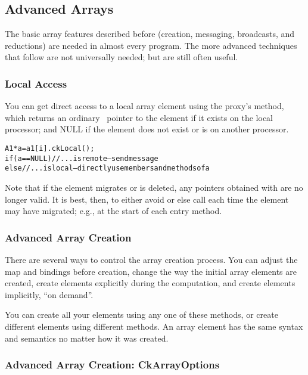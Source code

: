 \subsection{Advanced Arrays}

\label{advanced arrays}

The basic array features described before (creation, messaging,
broadcasts, and reductions) are needed in almost every
\charmpp{} program.  The more advanced techniques that follow
are not universally needed; but are still often useful.

\subsubsection{Local Access}

\label{ckLocal for arrays}
You can get direct access to a local array element using the
proxy's  method, which returns an ordinary \CC\ pointer
to the element if it exists on the local processor; and NULL if
the element does not exist or is on another processor.

\begin{alltt}
A1 *a=a1[i].ckLocal();
if (a==NULL) //...is remote-- send message
else //...is local-- directly use members and methods of a
\end{alltt}

Note that if the element migrates or is deleted, any pointers 
obtained with  are no longer valid.  It is best,
then, to either avoid  or else call  
each time the element may have migrated; e.g., at the start 
of each entry method.

\subsubsection{Advanced Array Creation}

\label{advanced array create}
There are several ways to control the array creation process.
You can adjust the map and bindings before creation, change
the way the initial array elements are created, create elements
explicitly during the computation, and create elements implicitly,
``on demand''.  

You can create all your elements using any one of these methods,
or create different elements using different methods.  
An array element has the same syntax and semantics no matter
how it was created.

\subsubsection{Advanced Array Creation: CkArrayOptions}

